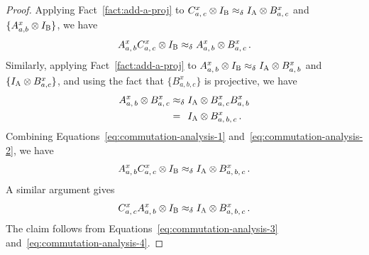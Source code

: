 \documentclass[11pt]{article}
\theoremstyle{definition}
\newcommand{\Id}{\ensuremath{I}}
\newcommand{\labelstyle}[1]{\ensuremath{\textsc{#1}}\xspace}
\newcommand{\alice}{\labelstyle{A}}
\newcommand{\bob}{\labelstyle{B}}
\begin{document}
\begin{proof}
  Applying Fact~\ref{fact:add-a-proj} to $C^x_{a,\, c} \otimes \Id_\bob
  \approx_\delta \Id_\alice \otimes B^x_{a,\, c}$ and $\{A^x_{a,b} \otimes
  \Id_\bob \}$, we have
  \begin{equation}
    \label{eq:commutation-analysis-1}
    A^x_{a,\, b} C^x_{a,\, c} \otimes \Id_\bob
    \approx_\delta A^x_{a,\, b} \otimes B^x_{a,\, c}\,.
  \end{equation}
  Similarly, applying Fact~\ref{fact:add-a-proj} to $A^x_{a,\, b} \otimes
  \Id_\bob \approx_\delta \Id_\alice \otimes B^x_{a,\, b}$ and $\{\Id_\alice
  \otimes B^x_{a,c}\}$, and using the fact that $\{B^x_{a,b,c}\}$ is projective,
  we have
  \begin{equation}
    \label{eq:commutation-analysis-2}
    \begin{split}
      A^x_{a,\, b} \otimes B^x_{a,\, c}
      & \approx_\delta \Id_\alice \otimes B^x_{a,\, c} B^x_{a,\, b}\\
      & =_{\phantom{\delta}} \Id_\alice \otimes B^x_{a,\, b,\, c}\,.
    \end{split}
  \end{equation}
  Combining Equations~\eqref{eq:commutation-analysis-1}
  and~\eqref{eq:commutation-analysis-2}, we have
  \begin{equation}
    \label{eq:commutation-analysis-3}
    A^x_{a,\, b} C^x_{a,\, c} \otimes \Id_\bob \approx_\delta
    \Id_\alice \otimes B^x_{a,\, b,\, c}\,.
  \end{equation}
  A similar argument gives
  \begin{equation}
    \label{eq:commutation-analysis-4}
    C^x_{a,\, c} A^x_{a,\, b} \otimes \Id_\bob \approx_\delta
    \Id_\alice \otimes B^x_{a,\, b,\, c}\,.
  \end{equation}
  The claim follows from Equations~\eqref{eq:commutation-analysis-3}
  and~\eqref{eq:commutation-analysis-4}.
\end{proof}
\end{document}
